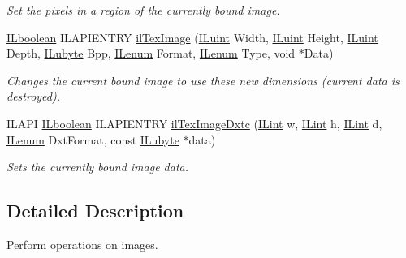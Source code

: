\begin{DoxyCompactItemize}
\begin{DoxyCompactList}\small\item\em Set the pixels in a region of the currently bound image. \end{DoxyCompactList}\item 
\hyperlink{group__il__types_gaa6aa7c95cfdc06b4d8601ef832b7bb0a}{I\+Lboolean} I\+L\+A\+P\+I\+E\+N\+T\+R\+Y \hyperlink{group__image__manip_ga4a0b02cccd4ccb9c863235fbfdb646eb}{il\+Tex\+Image} (\hyperlink{group__il__types_gaff8e86a1072c8d7cfe387fb87c6ed8e1}{I\+Luint} Width, \hyperlink{group__il__types_gaff8e86a1072c8d7cfe387fb87c6ed8e1}{I\+Luint} Height, \hyperlink{group__il__types_gaff8e86a1072c8d7cfe387fb87c6ed8e1}{I\+Luint} Depth, \hyperlink{group__il__types_ga057357939bc5a12e8061715453568519}{I\+Lubyte} Bpp, \hyperlink{group__il__types_ga62ca73445716183ef42b1f3906a45ed0}{I\+Lenum} Format, \hyperlink{group__il__types_ga62ca73445716183ef42b1f3906a45ed0}{I\+Lenum} Type, void $\ast$Data)
\begin{DoxyCompactList}\small\item\em Changes the current bound image to use these new dimensions (current data is destroyed). \end{DoxyCompactList}\item 
I\+L\+A\+P\+I \hyperlink{group__il__types_gaa6aa7c95cfdc06b4d8601ef832b7bb0a}{I\+Lboolean} I\+L\+A\+P\+I\+E\+N\+T\+R\+Y \hyperlink{group__image__manip_ga7be29284583785797fbda3b49a939975}{il\+Tex\+Image\+Dxtc} (\hyperlink{group__il__types_ga8effe51a00daaa0878631e5af75a36cb}{I\+Lint} w, \hyperlink{group__il__types_ga8effe51a00daaa0878631e5af75a36cb}{I\+Lint} h, \hyperlink{group__il__types_ga8effe51a00daaa0878631e5af75a36cb}{I\+Lint} d, \hyperlink{group__il__types_ga62ca73445716183ef42b1f3906a45ed0}{I\+Lenum} Dxt\+Format, const \hyperlink{group__il__types_ga057357939bc5a12e8061715453568519}{I\+Lubyte} $\ast$data)
\begin{DoxyCompactList}\small\item\em Sets the currently bound image data. \end{DoxyCompactList}\end{DoxyCompactItemize}


\subsection{Detailed Description}
Perform operations on images. 



